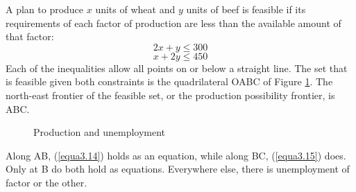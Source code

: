 A plan to produce $x$ units of wheat and $y$ units of beef is feasible if its requirements of each factor of production are less than the available amount of that factor:
\begin{equation} \label{equa3.14}
2x + y \leq 300
\end{equation}
\begin{equation} \label{equa3.15}
x + 2y \leq 450
\end{equation}
Each of the inequalities allow all points on or below a straight line. The set that is feasible given both constraints is the quadrilateral OABC of Figure \ref{Fig3.1}. The north-east frontier of the feasible set, or the production possibility frontier, is ABC.
\begin{figure}[!htb] %
\centering %
\caption{Production and unemployment} %
\label{Fig3.1} %
\end{figure}

Along AB, (\ref{equa3.14}) holds as an equation, while along BC, (\ref{equa3.15}) does. Only at B do both hold as equations. Everywhere else, there is unemployment
of factor or the other.

